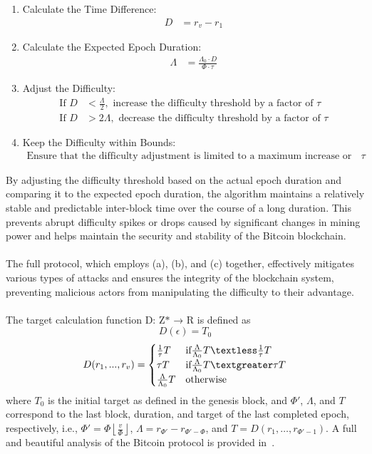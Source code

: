 \begin{enumerate}
    \item Calculate the Time Difference:
    \begin{align*}
        D &= r_v - r_1
    \end{align*}
    
    \item Calculate the Expected Epoch Duration:
    \begin{align*}
        \Lambda &= \frac{\Lambda_0 \cdot D}{\Phi \cdot \tau}
    \end{align*}
    
    \item Adjust the Difficulty:
    \begin{align*}
        \text{If } D &< \frac{\Lambda}{2}, \text{ increase the difficulty threshold by a factor of }\tau \\
        \text{If } D &> 2 \Lambda, \text{ decrease the difficulty threshold by a factor of }\tau
    \end{align*}
    
    \item Keep the Difficulty within Bounds:
    \begin{align*}
        \text{Ensure that the difficulty adjustment is limited to a maximum increase or decrease of a factor of }\tau
    \end{align*}
\end{enumerate}
By adjusting the difficulty threshold based on the actual epoch duration and comparing it to the expected epoch duration, the algorithm maintains a relatively stable and predictable inter-block time over the course of a long duration. This prevents abrupt difficulty spikes or drops caused by significant changes in mining power and helps maintain the security and stability of the Bitcoin blockchain.\\\\
The full protocol, which employs (a), (b), and (c) together, effectively mitigates various types of attacks and ensures the integrity of the blockchain system, preventing malicious actors from manipulating the difficulty to their advantage.\\\\
The target calculation function D: Z$\ast$ → R is defined as
\begin{equation*}
    D(\epsilon) = T_0
\end{equation*}
\[
D(r_{1}, ..., r_{v})=\begin{cases}
    \frac{1}{\tau}T & \text{if} \frac{\Lambda}{\Lambda_0}T \textless \frac{1}{\tau}T \\
    \tau T & \text{if} \frac{\Lambda}{\Lambda_0}T  \textgreater \tau T\\
    \frac{\Lambda}{\Lambda_0}T & \text{otherwise}
\end{cases}
\]
where $T_0$ is the initial target as defined in the genesis block, and $\Phi'$, $\Lambda$, and $T$ correspond to the last block, duration, and target of the last completed epoch, respectively, i.e., $\Phi' = \Phi\left\lfloor\frac{v}{\Phi}\right\rfloor$, $\Lambda = r_{\Phi'} - r_{\Phi'-\Phi}$, and $T = D(r_1,\dots,r_{\Phi'-1})$. A full and beautiful analysis of the Bitcoin protocol is provided in~\cite{reference2}.

